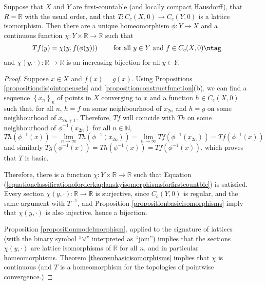 \begin{theorem}\label{theoremclassificationlatticemorphismfirstcountable}
Suppose that $X$ and $Y$ are first-countable (and locally compact Hausdorff), that $R=\mathbb{R}$ with the usual order, and that $T:C_c(X,0)\to C_c(Y,0)$ is a lattice isomorphism. Then there are a unique homeomorphism $\phi:Y\to X$ and a continuous function $\chi:Y\times\mathbb{R}\to\mathbb{R}$ such that
\[Tf(y)=\chi(y,f(\phi(y)))\qquad\text{ for all }y\in Y\text{ and }f\in C_c(X,0)\ntag\label{equationclassificationoforderkaplanskyisomorphismsforfirstcountble}\]
and $\chi(y,\cdot):\mathbb{R}\to\mathbb{R}$ is an increasing bijection for all $y\in Y$.
\end{theorem}
\begin{proof}
Suppose $x\in X$ and $f(x)=g(x)$. Using Propositions \ref{propositiondisjointopensets} and \ref{propositionconstructfunction}(b), we can find a sequence $\left\{x_n\right\}_n$ of points in $X$ converging to $x$ and a function $h\in C_c(X,0)$ such that, for all $n$, $h=f$ on some neighbourhood of $x_{2n}$ and $h=g$ on some neighbourhood of $x_{2n+1}$. Therefore, $Tf$ will coincide with $Th$ on some neighbourhood of $\phi^{-1}(x_{2n})$ for all $n\in\mathbb{N}$,
\[Th(\phi^{-1}(x))=\lim_{n\to\infty}Th(\phi^{-1}(x_{2n}))=\lim_{n\to\infty}Tf(\phi^{-1}(x_{2n}))= Tf(\phi^{-1}(x))\]
and similarly $Tg(\phi^{-1}(x))=Th(\phi^{-1}(x))=Tf(\phi^{-1}(x))$, which proves that $T$ is basic.

Therefore, there is a function $\chi:Y\times \mathbb{R}\to\mathbb{R}$ such that Equation (\ref{equationclassificationoforderkaplanskyisomorphismsforfirstcountble}) is satisfied. Every section $\chi(y,\cdot):\mathbb{R}\to\mathbb{R}$ is surjective, since $C_c(Y,0)$ is regular, and the same argument with $T^{-1}$, and Proposition \ref{propositionbasicisomorphisms} imply that $\chi(y,\cdot)$ is also injective, hence a bijection.

Proposition \ref{propositionmodelmorphism}, applied to the signature of lattices (with the binary symbol ``$\lor$'' interpreted as ``join'') implies that the sections $\chi(y,\cdot)$ are lattice isomorphisms of $\mathbb{R}$ for all $n$, and in particular homeomorphisms. Theorem \ref{theorembasicisomorphisms} implies that $\chi$ is continuous (and $T$ is a homeomorphism for the topologies of pointwise convergence.)
\end{proof}

